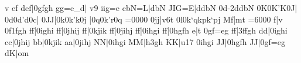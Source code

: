   \else \ioctfinup v\relax
  \fi {}ef\enotes
\temps\notes{}def|\qsoqh0gfgh\enotes
\Alaligne\noteskipLarge\notes{}gg{=e}{_d}|\relax
  \ifx\mxversion\undefined\octfin v9\fi
  iig{=e}\enotes
\temps\notes{}cbN{=L}|dbN\relax
 \ifx\mxversion\undefined\else\toctfin\fi
 \enotes
\barre\notes{}JIG{=E}|ddbN\enotes
\temps\notes{}\ibu0d{-2}\boqh d\qsk\boqh d\boqh b\boqh N\enotes
\barre\notes{}\ibu0K0\boqh K\qsk\rq K\qh0J|\enotes
\temps\notes{}\ibu0d0\boqh d\qsk\rq d\qh0c|\enotes
\temps\notes\dsoqb0JJ|\ibu0k0\boqh k\rq k\qh0j\enotes
\temps\notes|\ibu0q0\soqh k\qsk\rq r\qh0q\enotes
\cleftoksi={{0}{0}{0}{0}}\zchangeclefs
\barre\noteskipLarge\def\scalenoteskip{1.05}\relax
\notes\dsoqb0jj|\ifx\mxversion\undefined\octsup v6\else\ioctfinup t\fi
 \ibl0l0\soqb k\lq q\soqb k\zq p\soqb k\lq p\soqb j\enotes
\temps\notes\zq M\cu f|\zq m\cl t\zbreath\enotes
\cleftoksi={{6}{0}{0}{0}}\changeclefs
\def\atnextline{\staffbotmarg=3\Interligne\def\interfacteur{11}}%
\Zalapage\notes{}\enotes
\temps\notes\dsoupir\boql f|\ifx\mxversion\undefined\octline v\fi
  \ibl0f1\soqb f\soqb g\soqb h\enotes
\barre\notes{}\boql f\sk\boql f|\qsoqb0ighi\enotes
\temps\notes\boql f\sk\boql f|\qsoqb0jhij\enotes
\barre\notes\boql f\sk\boql f|\qsoqb0kjik\enotes
\temps\notes\boql f\sk\boql f|\qsoqb0jihj\enotes
\barre\notes\boql f\sk\boql f|\qsoqb0ihgi\enotes
\temps\notes\boql f\sk\boql f|\qsoqb0hgfh\enotes
\Alaligne\noteskipLarge
\notes{}\sk\boql e|\ifx\mxversion\undefined\octline t\fi
 \qsoqb0gf{=e}g\enotes
\temps\notes\boql f\sk\boql f|\qsoqb3ffgh\enotes
\barre\notes\boql d\sk\boql d|\qsoqb0ighi\enotes
\temps\notes\boql c\sk\boql c|\qsoqb0jhij\enotes
\barre\notes\boql b\sk\boql b|\qsoqb0kjik\enotes
\temps\notes\boql a\sk\boql a|\qsoqb0jihj\enotes
\barre\notes\boql N\sk\boql N|\qsoqb0ihgi\enotes
\temps\notes\boql M\sk\boql M|\soql h\sk\dsoqb3gh\enotes
\Alaligne\notes\boql K\sk\boql K|\ifx\mxversion\undefined\octfin u{17}\fi
  \qsoqb0ihgi\enotes
\temps\notes\boql J\sk\boql J|\qsoqb0hgfh\enotes
\barre\notes\boql J\sk\boql J|\qsoqb0gf{=e}g\enotes
\temps\NOtes\pointdorgue d\bohu K|\pointdorgue o\bohl m\relax

